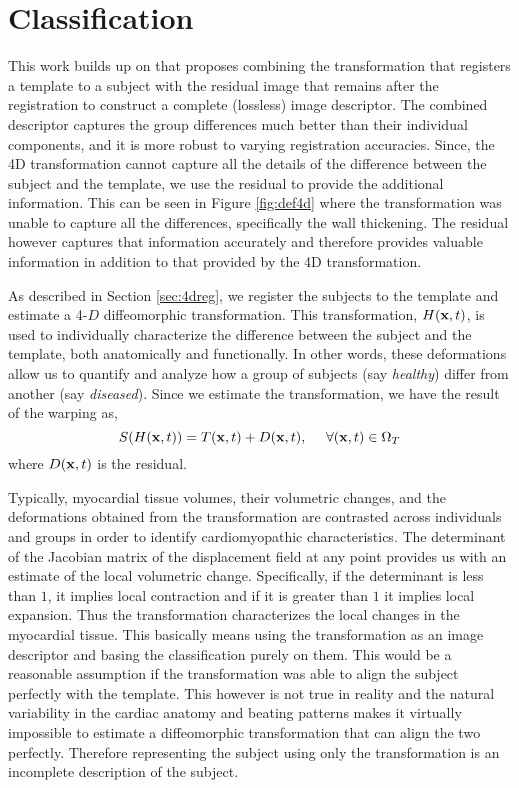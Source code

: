 \section{Classification}
\label{sec:classify}

This work builds up on \cite{residual} that proposes combining the transformation that registers a template to a subject with the residual image that remains after the registration to construct a complete (lossless) image descriptor. The combined descriptor captures the group differences much better than their individual components, and it is more robust to varying registration accuracies. Since, the 4D transformation cannot capture all the details of the difference between the subject and the template, we use the residual to provide the additional information. This can be seen in Figure \ref{fig:def4d} where the transformation was unable to capture all the differences, specifically the wall thickening. The residual however captures that information accurately and therefore provides valuable information in addition to that provided by the 4D transformation.

As described in Section \ref{sec:4dreg}, we register the subjects to the template and estimate a 4-$D$ diffeomorphic transformation. This transformation, $H(\mathbf{x}, t)$, is used to individually characterize the difference between the subject and the template, both anatomically and functionally. In other words, these deformations allow us to quantify and analyze how a group of subjects (say {\em healthy}) differ from another (say {\em diseased}). Since we estimate the transformation, we have the result of the warping as,
\begin{equation}
S(H(\mathbf{x}, t)) = T(\mathbf{x}, t) + D(\mathbf{x}, t), ~~~~\forall (\mathbf{x},t) \in \Omega_T
\end{equation}
where $D(\mathbf{x}, t)$ is the residual. 

Typically, myocardial tissue volumes, their volumetric changes, and the deformations obtained from the transformation are contrasted across individuals and groups in order to identify cardiomyopathic characteristics. The determinant of the Jacobian matrix of the displacement field at any point provides us with an estimate of the local volumetric change. Specifically, if the determinant is less than $1$, it implies local contraction and if it is greater than $1$ it implies local expansion. Thus the transformation characterizes the local changes in the myocardial tissue. This basically means using the transformation as an image descriptor and basing the classification purely on them. This would be a reasonable assumption if the transformation was able to align the subject perfectly with the template. This however is not true in reality and the natural variability in the cardiac anatomy and beating patterns makes it virtually impossible to estimate a diffeomorphic transformation that can align the two perfectly. Therefore representing the subject using only the transformation is an incomplete description of the subject.

